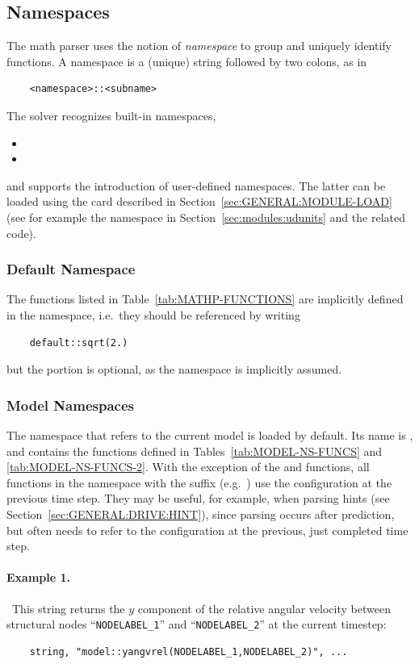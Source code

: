 \subsection{Namespaces}
\label{sec:GENERAL:NAMESPACE}
The math parser uses the notion of \emph{namespace} to group and uniquely identify functions.
A namespace is a (unique) string followed by two colons, as in
\begin{verbatim}
    <namespace>::<subname>
\end{verbatim}
The solver recognizes built-in namespaces,
\begin{itemize}
	\item {}
	\item {}
\end{itemize}
and supports the introduction of user-defined namespaces.
The latter can be loaded using the  card described
in Section~\ref{sec:GENERAL:MODULE-LOAD}
(see for example the  namespace in Section~\ref{sec:modules:udunits} and the related code).

\subsubsection{Default Namespace}
The functions listed in Table~\ref{tab:MATHP-FUNCTIONS}
are implicitly defined in the  namespace, 
i.e.\ they should be referenced by writing
\begin{verbatim}
    default::sqrt(2.)
\end{verbatim}
but the  portion is optional, as the  namespace is implicitly assumed.

\subsubsection{Model Namespaces}
The namespace that refers to the current model is loaded by default.
Its name is , and contains the functions 
defined in Tables~\ref{tab:MODEL-NS-FUNCS} and \ref{tab:MODEL-NS-FUNCS-2}.
With the exception of the  and  functions,
all functions in the  namespace
with the suffix  (e.g.\ )
use the configuration at the previous time step.
They may be useful, for example, when parsing hints
(see Section~\ref{sec:GENERAL:DRIVE:HINT}),
since  parsing occurs after prediction,
but often needs to refer to the configuration
at the previous, just completed time step.

\paragraph{Example 1.} \
This string returns the $y$ component of the relative angular velocity between structural nodes ``\verb;NODELABEL_1;'' and ``\verb;NODELABEL_2;'' at the current timestep:
\begin{verbatim}
    string, "model::yangvrel(NODELABEL_1,NODELABEL_2)", ...
\end{verbatim}

